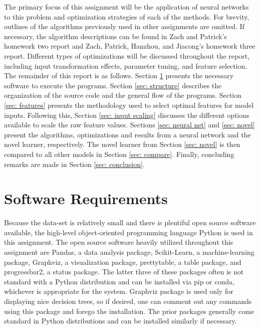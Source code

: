 \documentclass[paper=a4, fontsize=11pt]{scrartcl} %
\begin{document}
The primary focus of this assignment will be the application of neural networks to this problem and optimization strategies of each of the methods.
For brevity, outlines of the algorithms previously used in other assignments are omitted.
If necessary, the algorithm descriptions can be found in Zach and Patrick's homework two report and Zach, Patrick, Hanzhou, and Jiacong's homework three report.
Different types of optimizations will be discussed throughout the report, including input transformation effects, parameter tuning, and feature selection.
\\


The remainder of this report is as follows.
Section \ref{sec: software} presents the necessary software to execute the programs.
Section \ref{sec: structure} describes the organization of the source code and the general flow of the programs.
Section \ref{sec: features} presents the methodology used to select optimal features for model inputs.
Following this, Section \ref{sec: input scaling} discusses the different options available to scale the raw feature values.
Sections \ref{sec: neural net} and \ref{sec: novel} present the algorithms, optimizations and results from a neural network and the novel learner, respectively.
The novel learner from Section \ref{sec: novel} is then compared to all other models in Section \ref{sec: compare}.
Finally, concluding remarks are made in Section \ref{sec: conclusion}.
	
\section{Software Requirements} \label{sec: software}

Because the data-set is relatively small and there is plentiful open source software available, the high-level object-oriented programming language Python is used in this assignment.
The open source software heavily utilized throughout this assignment are Pandas, a data analysis package, Scikit-Learn, a machine-learning package, Graphviz, a visualization package, prettytable, a table package, and progressbar2, a status package. 
The latter three of these packages often is not standard with a Python distribution and can be installed via pip or conda, whichever is appropriate for the system. 
Graphviz package is used only for displaying nice decision trees, so if desired, one can comment out any commands using this package and forego the installation.
The prior packages generally come standard in Python distributions and can be installed similarly if necessary.
\end{document}

